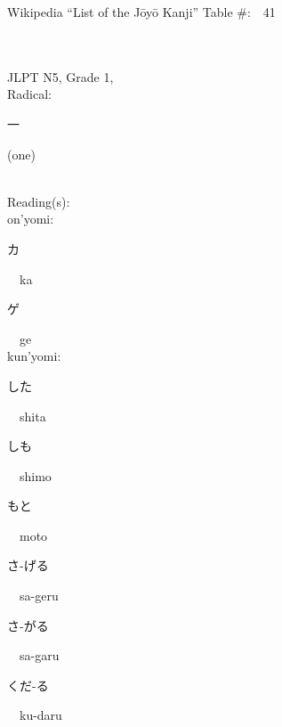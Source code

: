 \begin{multicols}{2}
Wikipedia ``List of the J\=oy\=o Kanji'' Table \#:\ \ 41 \\
\ \ \\
{\fontsize{34pt}{40pt}  }\ \ \\  %
{JLPT N5, Grade 1, \\Radical:\ \ {\begin{CJK}{UTF8}{min} 一 \end{CJK}} (one) } \\
Reading(s):\ \ \\
{\hspace*{1em}}on'yomi:\ \ \\
{\hspace*{2em}}{\begin{CJK}{UTF8}{min} カ \end{CJK}}\ \ ka\ \ \\
{\hspace*{2em}}{\begin{CJK}{UTF8}{min} ゲ \end{CJK}}\ \ ge\ \ \\
{\hspace*{1em}}kun'yomi:\ \ \\
{\hspace*{2em}}{\begin{CJK}{UTF8}{min} した \end{CJK}}\ \ shita\ \ \\
{\hspace*{2em}}{\begin{CJK}{UTF8}{min} しも \end{CJK}}\ \ shimo\ \ \\
{\hspace*{2em}}{\begin{CJK}{UTF8}{min} もと \end{CJK}}\ \ moto\ \ \\
{\hspace*{2em}}{\begin{CJK}{UTF8}{min} さ-げる \end{CJK}}\ \ sa-geru\ \ \\
{\hspace*{2em}}{\begin{CJK}{UTF8}{min} さ-がる \end{CJK}}\ \ sa-garu\ \ \\
{\hspace*{2em}}{\begin{CJK}{UTF8}{min} くだ-る \end{CJK}}\ \ ku-daru\ \ \\

\end{multicols}
